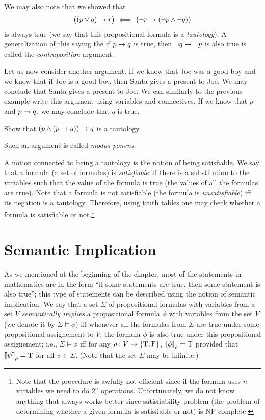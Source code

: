 We may also note that we showed that
\[
  \bigl((p \lor q) \rightarrow r\bigr) \iff
  \bigl(\lnot r \rightarrow (\lnot p \land \lnot q) \bigr)
\]
is always true (we say that this propositional formula is a
\emph{tautology}). A generalization of this saying the if $p \rightarrow q$ is
true, then $\lnot q \rightarrow \lnot p$ is also true is called the
\emph{contraposition} argument.

Let us now consider another argument. If we know that Joe was a good boy and we
know that if Joe is a good boy, then Santa gives a present to Joe. We may
conclude that Santa gives a present to Joe. We can similarly to the previous
example write this argument using variables and connectives.
If we know that $p$ and $p \rightarrow q$, we may conclude that $q$ is true.
\begin{exercise}
  Show that $(p \land (p \rightarrow q)) \rightarrow q$ is a tautology.
\end{exercise}
Such an argument is called \emph{modus ponens}.

A notion connected to being a tautology is the notion of being satisfiable.
We say that a formula (a set of formulas) is \emph{satisfiable} iff there
is a substitution to the variables such that the value of the formula is true
(the values of all the formulas are true). Note that a formula is not
satisfiable (the formula is \emph{unsatisfiable}) iff its negation is
a tautology. Therefore, using truth tables one may check whether a formula
is satisfiable or not.\footnote{%
  Note that the procedure is awfully not efficient since if the formula
  uses $n$ variables we need to do $2^n$ operations. Unfortunately,
  we do not know anything that always works better since
  satisfiability problem (the problem of determining whether a given formula is
  satisfiable or not) is NP complete.
}

\section{Semantic Implication}
As we mentioned at the beginning of the chapter, most of the
statements in mathematics are in the form
``if some statements are true, then some statement is also true'';
this type of statements can be described using the notion of semantic
implication. We say that a set $\Sigma$ of propositional formulas with
variables from a set $V$ \emph{semantically implies} a propositional formula
$\phi$ with variables from the set $V$ (we denote it by $\Sigma \models \phi$)
iff whenever all the formulas from $\Sigma$ are true under some propositional
assignement to $V$, the formula $\phi$ is also true under this propositional
assignement; i.e.,
$\Sigma \models \phi$ iff for any $\rho : V \to \set{\ltrue, \lfalse}$,
$\left\llbracket {\phi} \right\rrbracket_{\rho} = \text{T}$ provided that
$\left\llbracket {\psi} \right\rrbracket_{\rho} = \text{T}$ for all $\psi \in \Sigma$.
(Note that the set $\Sigma$ may be infinite.)


